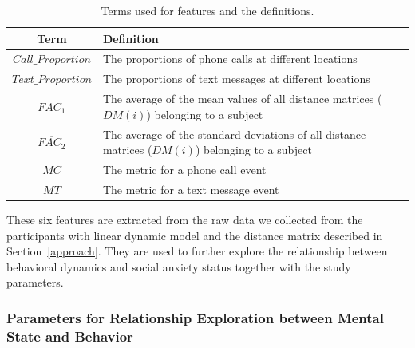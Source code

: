 \begin{table}
\caption{Terms used for features and the definitions. \label{tab:def}}
\begin{center}
\small
	\begin{tabular}{ c  p{5in} }
    \toprule
    			\textbf{Term}				&   	\textbf{Definition}			\\
        \midrule
        $Call\_Proportion$				&	The proportions of phone calls at different locations\\
        $Text\_Proportion$				&	The proportions of text messages at different locations\\
        $\overline{FAC_1}$				&	The average of the mean values of all distance matrices ($DM(i)$) belonging to a subject \\  
        $\overline{FAC_2}$				&	The average of the standard deviations of all distance matrices ($DM(i)$) belonging to a subject\\
        $MC$				&	The metric for a phone call event\\
        $MT$				&	The metric for a text message event\\
        \bottomrule
	\end{tabular}
\end{center}
\end{table}


These six features are extracted from the raw data we collected from the participants with linear dynamic model and the distance matrix described in Section~\ref{approach}. They are used to further explore the relationship between behavioral dynamics and social anxiety status together with the study parameters. 


\subsubsection{Parameters for Relationship Exploration between Mental State and Behavior}
\label{parameters}


